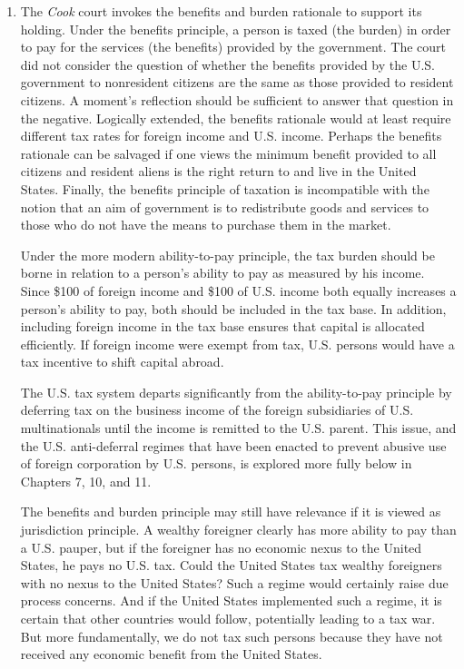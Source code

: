 \begin{enumerate}
	\item

The  \textit{Cook} court invokes the benefits and burden rationale to support its holding.  Under the benefits principle, a person is taxed (the burden) in order to pay for the services (the benefits) provided by the government.  The court did not consider the question of whether the benefits provided by the U.S. government to nonresident citizens are the same as those provided to resident citizens.  A moment's reflection should be sufficient to answer that question in the negative.  Logically extended, the benefits rationale would at least require different tax rates for foreign income and U.S. income.  Perhaps the benefits rationale can be salvaged if one views the minimum benefit provided to all citizens and resident aliens is the right return to and live in the United States.  Finally, the benefits principle of taxation is incompatible with the notion that an aim of government is to redistribute goods and services to those who do not have the means to purchase them in the market.    

Under the more modern ability-to-pay principle, the tax burden should be borne in relation to a person's ability to pay as measured by his income.  Since \$100 of foreign income and \$100 of U.S. income both equally increases a person's ability to pay, both should be included in the tax base.  In addition, including foreign income in the tax base ensures that capital is allocated efficiently.  If foreign income were exempt from tax, U.S. persons would have a tax incentive to shift capital abroad.  

The U.S. tax system departs significantly from the ability-to-pay principle by deferring tax on the business income of the foreign subsidiaries of U.S. multinationals until the income is remitted to the U.S. parent.  This issue, and the U.S. anti-deferral regimes that have been enacted to prevent abusive use of foreign corporation by U.S. persons, is explored more fully below in Chapters 7, 10, and 11.

The benefits and burden principle may still have relevance if it is viewed as jurisdiction principle.  A wealthy foreigner clearly has more ability to pay than a U.S. pauper, but if the foreigner has no economic nexus to the United States, he pays no U.S. tax.  Could the United States tax wealthy foreigners with no nexus to the United States?  Such a regime would certainly raise due process concerns.  And if the United States implemented such a regime, it is certain that other countries would follow, potentially leading to a tax war. But more fundamentally, we do not tax such persons because they have not received any economic benefit from the United States.  


\end{enumerate}

